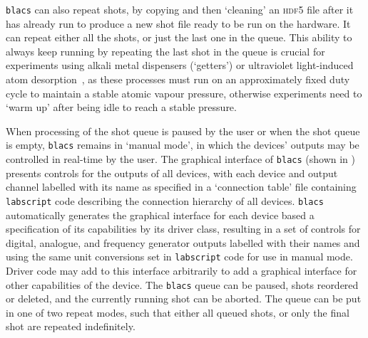 \texttt{blacs} can also repeat shots, by copying and then `cleaning' an \textsc{hdf5} file after it has already run to produce a new shot file ready to be run on the hardware. It can repeat either all the shots, or just the last one in the queue. This ability to always keep running by repeating the last shot in the queue is crucial for experiments using alkali metal dispensers (`getters') or ultraviolet light-induced atom desorption~\cite{klempt_ultraviolet_2006}, as these processes must run on an approximately fixed duty cycle to maintain a stable atomic vapour pressure, otherwise experiments need to `warm up' after being idle to reach a stable pressure.

When processing of the shot queue is paused by the user or when the shot queue is empty, \texttt{blacs} remains in `manual mode', in which the devices' outputs may be controlled in real-time by the user. The graphical interface of \texttt{blacs} (shown in ) presents controls for the outputs of all devices, with each device and output channel labelled with its name as specified in a `connection table' file containing \texttt{labscript} code describing the connection hierarchy of all devices. \texttt{blacs} automatically generates the graphical interface for each device based a specification of its capabilities by its driver class, resulting in a set of controls for digital, analogue, and frequency generator outputs labelled with their names and using the same unit conversions set in \texttt{labscript} code for use in manual mode. Driver code may add to this interface arbitrarily to add a graphical interface for other capabilities of the device. The \texttt{blacs} queue can be paused, shots reordered or deleted, and the currently running shot can be aborted. The queue can be put in one of two repeat modes, such that either all queued shots, or only the final shot are repeated indefinitely.


